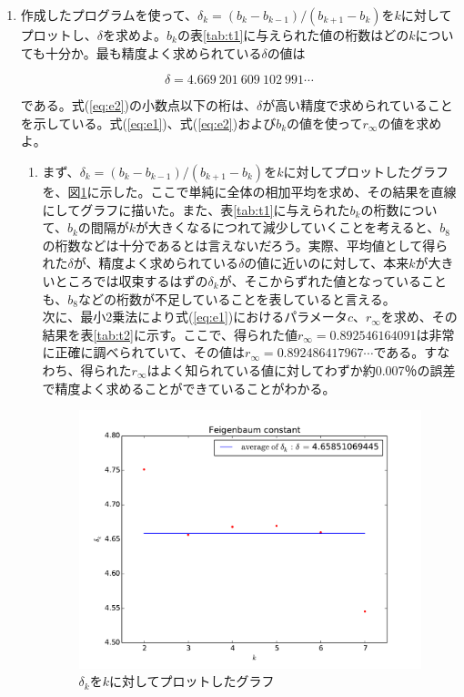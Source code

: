 \documentclass{jsarticle}
\begin{document}
\begin{enumerate}
 \renewcommand{\labelenumi}{\alph{enumi}.}
 \renewcommand{\labelenumii}{}

 \item 作成したプログラムを使って、$\delta_{k}=(b_{k}-b_{k-1})/(b_{k+1}-b_{k})$を$k$に対してプロットし、$\delta$を求めよ。$b_{k}$の表\ref{tab:t1}に与えられた値の桁数はどの$k$についても十分か。最も精度よく求められている$\delta$の値は
 
 \begin{equation}
  \delta = 4.669\ 201\ 609\ 102\ 991 \cdots
  \label{eq:e2}
 \end{equation}

 である。式(\ref{eq:e2})の小数点以下の桁は、$\delta$が高い精度で求められていることを示している。式(\ref{eq:e1})、式(\ref{eq:e2})および$b_{k}$の値を使って$r_{\infty}$の値を求めよ。

 
  \begin{enumerate}
   \item まず、$\delta_{k}=(b_{k}-b_{k-1})/(b_{k+1}-b_{k})$を$k$に対してプロットしたグラフを、図\ref{fig:f1}に示した。ここで単純に全体の相加平均を求め、その結果を直線にしてグラフに描いた。また、表\ref{tab:t1}に与えられた$b_{k}$の桁数について、$b_{k}$の間隔が$k$が大きくなるにつれて減少していくことを考えると、$b_{8}$の桁数などは十分であるとは言えないだろう。実際、平均値として得られた$\delta$が、精度よく求められている$\delta$の値に近いのに対して、本来$k$が大きいところでは収束するはずの$\delta_{k}$が、そこからずれた値となっていることも、$b_{8}$などの桁数が不足していることを表していると言える。\\
   次に、最小2乗法により式(\ref{eq:e1})におけるパラメータ$c$、$r_{\infty}$を求め、その結果を表\ref{tab:t2}に示す。ここで、得られた値$r_{\infty}=0.892 546 164 091$は非常に正確に調べられていて、その値は$r_{\infty}=0.892 486 417 967 \cdots$である。すなわち、得られた$r_{\infty}$はよく知られている値に対してわずか約0.007％の誤差で精度よく求めることができていることがわかる。

   \begin{figure}[H]
    \begin{center}
     \includegraphics[width=12.0cm]{figure_1.pdf}
     \caption{$\delta_{k}$を$k$に対してプロットしたグラフ}
     \label{fig:f1}
    \end{center}
   \end{figure}
   

\end{enumerate}
\end{enumerate}
\end{document}
